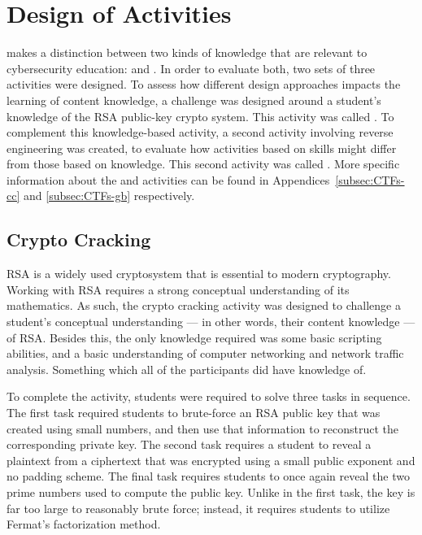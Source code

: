 


\providecommand{\heading}[1]{\section{#1}}
\providecommand{\subheading}[1]{\subsection{#1}}

\heading{Design of Activities}
    \textcite{R-Weiss} makes a distinction between two kinds of knowledge that are relevant to cybersecurity education:  and . %
In order to evaluate both, two sets of three activities were designed. %
To assess how different design approaches impacts the learning of content knowledge, a challenge was designed around a student's  knowledge of the RSA public-key crypto system. %
This activity was called . %
To complement this knowledge-based activity, a second activity involving reverse engineering was created, to evaluate how activities based on skills might differ from those based on knowledge. %
This second activity was called . %
More specific information about the  and  activities can be found in Appendices~\ref{subsec:CTFs-cc} and \ref{subsec:CTFs-gb} respectively.

\subheading{Crypto Cracking}
    RSA is a widely used cryptosystem that is essential to modern cryptography. %
Working with RSA requires a strong conceptual understanding of its mathematics. %
As such, the crypto cracking activity was designed to challenge a student's conceptual understanding ---%
 in other words, their content knowledge ---%
 of RSA. Besides this, the only knowledge required was some basic scripting abilities, and a basic understanding of computer networking and network traffic analysis. %
Something which all of the participants did have knowledge of. 

        
    To complete the activity, students were required to solve three tasks in sequence. %
The first task required students to brute-force an RSA public key that was created using small numbers, and then use that information to reconstruct the corresponding private key. %
The second task requires a student to reveal a plaintext from a ciphertext that was encrypted using a small public exponent and no padding scheme. %
The final task requires students to once again reveal the two prime numbers used to compute the public key. %
Unlike in the first task, the key is far too large to reasonably brute force; %
instead, it requires students to utilize Fermat's factorization method. 

